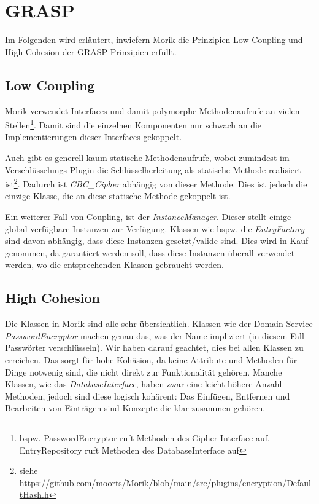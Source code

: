 \section{GRASP}

Im Folgenden wird erläutert, inwiefern Morik die Prinzipien Low Coupling und High Cohesion der GRASP Prinzipien erfüllt.

\subsection{Low Coupling}

Morik verwendet Interfaces und damit polymorphe Methodenaufrufe an vielen Stellen\footnote{bspw. PasswordEncryptor ruft Methoden des Cipher Interface auf, EntryRepository ruft Methoden des DatabaseInterface auf}. Damit sind die einzelnen Komponenten nur schwach an die Implementierungen dieser Interfaces gekoppelt.

Auch gibt es generell kaum statische Methodenaufrufe, wobei zumindest im Verschlüsselungs-Plugin die Schlüsselherleitung als statische Methode realisiert ist\footnote{siehe \url{https://github.com/moorts/Morik/blob/main/src/plugins/encryption/DefaultHash.h}}. Dadurch ist \textit{CBC\_Cipher} abhängig von dieser Methode. Dies ist jedoch die einzige Klasse, die an diese statische Methode gekoppelt ist.

Ein weiterer Fall von Coupling, ist der \href{https://github.com/moorts/Morik/blob/main/src/application/InstanceManager.h}{\textit{InstanceManager}}. Dieser stellt einige global verfügbare Instanzen zur Verfügung. Klassen wie bspw. die \textit{EntryFactory} sind davon abhängig, dass diese Instanzen gesetzt/valide sind. Dies wird in Kauf genommen, da garantiert werden soll, dass diese Instanzen überall verwendet werden, wo die entsprechenden Klassen gebraucht werden.

\subsection{High Cohesion}

Die Klassen in Morik sind alle sehr übersichtlich. Klassen wie der Domain Service \textit{PasswordEncryptor} machen genau das, was der Name impliziert (in diesem Fall Passwörter verschlüsseln). Wir haben darauf geachtet, dies bei allen Klassen zu erreichen. Das sorgt für hohe Kohäsion, da keine Attribute und Methoden für Dinge notwenig sind, die nicht direkt zur Funktionalität gehören. Manche Klassen, wie das \href{https://github.com/moorts/Morik/blob/main/src/adapters/database/DatabaseInterface.h}{\textit{DatabaseInterface}}, haben zwar eine leicht höhere Anzahl Methoden, jedoch sind diese logisch kohärent: Das Einfügen, Entfernen und Bearbeiten von Einträgen sind Konzepte die klar zusammen gehören.
